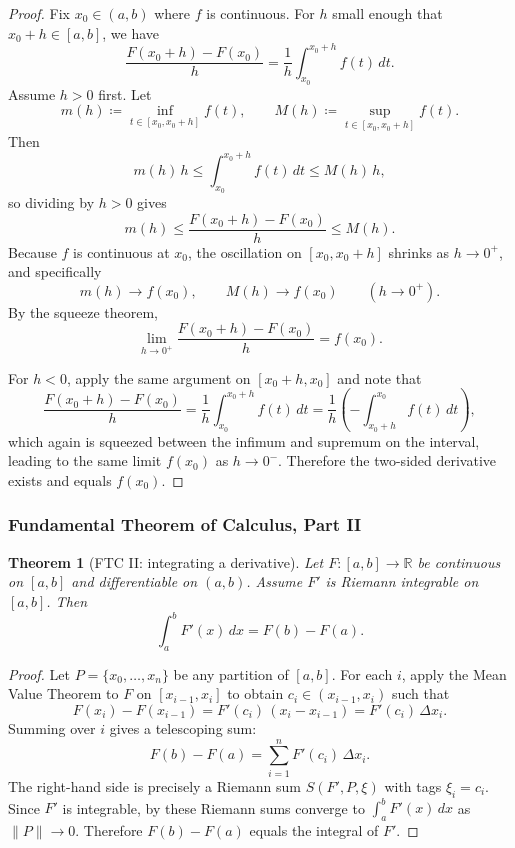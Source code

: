 \documentclass[12pt]{article}
\numberwithin{equation}{section}
\def\diff{d}
\newcommand{\RR}{\mathbb{R}}
\newcommand{\diff}{\mathop{}\!\mathrm{d}}    %
\theoremstyle{plain}
\newtheorem{theorem}{Theorem}[section]
\theoremstyle{definition}
\theoremstyle{remark}
\begin{document}
\begin{proof}
Fix $x_0\in(a,b)$ where $f$ is continuous.
For $h$ small enough that $x_0+h\in[a,b]$, we have
\[
\frac{F(x_0+h)-F(x_0)}{h}
=
\frac{1}{h}\int_{x_0}^{x_0+h} f(t)\,\diff t.
\]
Assume $h>0$ first. Let
\[
m(h)\coloneqq \inf_{t\in[x_0,x_0+h]} f(t),
\qquad
M(h)\coloneqq \sup_{t\in[x_0,x_0+h]} f(t).
\]
Then
\[
m(h)\,h \le \int_{x_0}^{x_0+h} f(t)\,\diff t \le M(h)\,h,
\]
so dividing by $h>0$ gives
\[
m(h)\le \frac{F(x_0+h)-F(x_0)}{h}\le M(h).
\]
Because $f$ is continuous at $x_0$, the oscillation on $[x_0,x_0+h]$ shrinks as $h\to 0^+$, and specifically
\[
m(h)\to f(x_0),\qquad M(h)\to f(x_0)\qquad (h\to 0^+).
\]
By the squeeze theorem,
\[
\lim_{h\to 0^+}\frac{F(x_0+h)-F(x_0)}{h}=f(x_0).
\]

For $h<0$, apply the same argument on $[x_0+h,x_0]$ and note that
\[
\frac{F(x_0+h)-F(x_0)}{h}
=
\frac{1}{h}\int_{x_0}^{x_0+h} f(t)\,\diff t
=
\frac{1}{h}\left(-\int_{x_0+h}^{x_0} f(t)\,\diff t\right),
\]
which again is squeezed between the infimum and supremum on the interval, leading to the same limit $f(x_0)$ as $h\to 0^-$.
Therefore the two-sided derivative exists and equals $f(x_0)$.
\end{proof}

\subsubsection{Fundamental Theorem of Calculus, Part II}

\begin{theorem}[FTC II: integrating a derivative]\label{thm:ftc2}
Let $F:[a,b]\to\RR$ be continuous on $[a,b]$ and differentiable on $(a,b)$.
Assume $F'$ is Riemann integrable on $[a,b]$.
Then
\[
\int_a^b F'(x)\,\diff x = F(b)-F(a).
\]
\end{theorem}

\begin{proof}
Let $P=\{x_0,\dots,x_n\}$ be any partition of $[a,b]$.
For each $i$, apply the Mean Value Theorem to $F$ on $[x_{i-1},x_i]$ to obtain $c_i\in(x_{i-1},x_i)$ such that
\[
F(x_i)-F(x_{i-1}) = F'(c_i)\,(x_i-x_{i-1})=F'(c_i)\,\Delta x_i.
\]
Summing over $i$ gives a telescoping sum:
\[
F(b)-F(a)=\sum_{i=1}^n F'(c_i)\,\Delta x_i.
\]
The right-hand side is precisely a Riemann sum $S(F',P,\xi)$ with tags $\xi_i=c_i$.
Since $F'$ is integrable, by  these Riemann sums converge to $\int_a^b F'(x)\,\diff x$ as $\|P\|\to 0$.
Therefore $F(b)-F(a)$ equals the integral of $F'$.
\end{proof}
\end{document}

